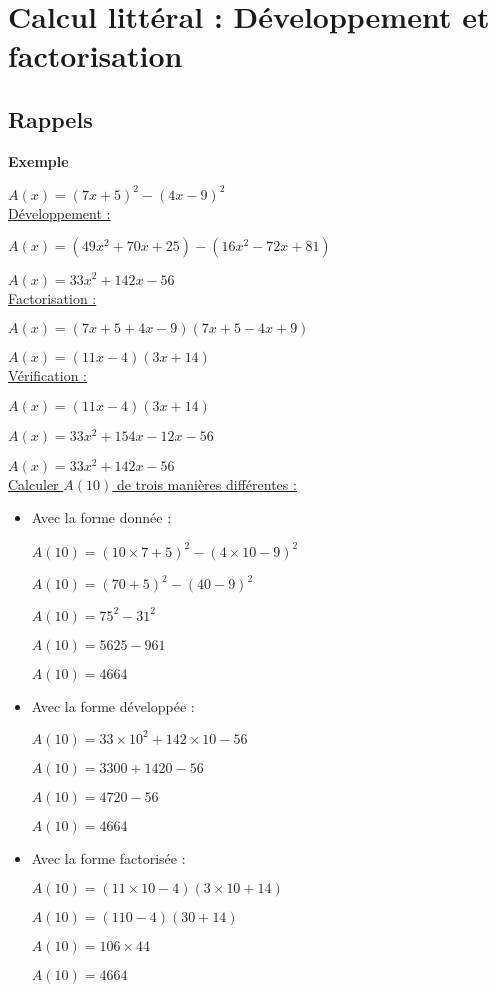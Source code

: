 
\section{Calcul littéral : Développement et factorisation}

\subsection{Rappels}

\textbf{Exemple }

$ A(x) = \left(7x + 5\right)^2 - \left(4x-9\right)^2 $ \\

\underline{Développement :}

$ A(x) = \left(49x^2 + 70x + 25\right)-\left(16x^2-72x+81\right) $

$A(x) = 33x^2+142x-56$ \\


\underline{Factorisation :}

$ A(x) = \left(7x + 5 + 4x -9\right)\left(7x+5-4x+9\right) $

$ A(x) = \left(11x-4\right)\left(3x+14\right) $ \\

\underline{Vérification :}

$ A(x) = \left(11x-4\right)\left(3x+14\right) $

$ A(x) = 33x^2 + 154x - 12x - 56 $

$ A(x) = 33x^2 + 142x - 56 $ \\

\underline{Calculer $ A(10) $ de trois manières différentes :} \\

\begin{itemize}
\item Avec la forme donnée :

$ A(10) = \left( 10\times7+5\right)^2 - \left(4\times 10-9\right)^2 $

$ A(10) = \left(70+5\right)^2 - \left(40-9\right)^2 $

$A(10) = 75^2 - 31^2 $

$A(10) = 5625 - 961 $

$A(10) = 4664 $ \\

\item Avec la forme développée : 

$ A(10) = 33 \times 10^2 + 142 \times 10 - 56 $

$A(10) = 3300 + 1420 - 56 $

$ A(10) = 4720 - 56 $

$ A(10) = 4664 $ \\

\item Avec la forme factorisée :

$ A(10) = \left(11\times 10 - 4\right)\left(3\times 10 + 14\right) $

$ A(10) =\left(110-4\right)\left(30 + 14\right) $

$ A(10) = 106 \times 44 $

$ A(10) = 4664 $
\end{itemize}

